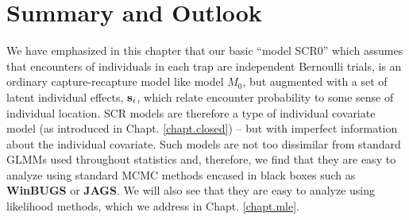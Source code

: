 {



\section{ Summary and Outlook }

We have emphasized in this chapter that our basic ``model SCR0'' which
assumes that encounters of individuals in each trap are independent
Bernoulli trials, 
is an ordinary capture-recapture model like model $M_0$, 
 but augmented with a set
of latent individual effects, ${\bf s}_{i}$, which relate encounter
probability to some sense of individual location. SCR models are
therefore a type of individual covariate model (as introduced in
Chapt. \ref{chapt.closed}) -- but with imperfect information about the
individual covariate.
Such models are not too dissimilar from standard GLMMs used throughout
statistics and, therefore, we
find that they are  easy to analyze using standard MCMC
methods encased in black boxes such as {\bf WinBUGS} or {\bf JAGS}. 
We will also see that they are easy to analyze using
likelihood methods, which we address in Chapt. \ref{chapt.mle}.

}

